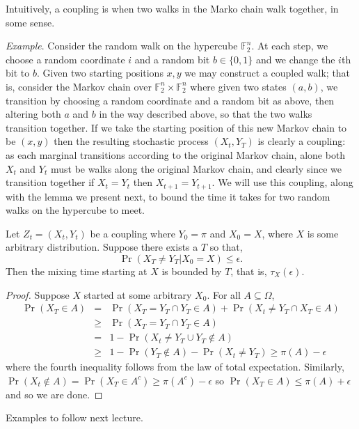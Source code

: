 Intuitively, a coupling is when two walks in the Marko chain walk together, in some sense.

\emph{Example}. Consider the random walk on the hypercube $\mathbb{F}_2^n$. At each step, we choose a random coordinate $i$ and a random bit $b \in \{0, 1\}$ and we change the $i$th bit to $b$. Given two starting positions $x, y$ we may construct a coupled walk; that is, consider the Markov chain over $\mathbb{F}_2^n \times \mathbb{F}_2^n$ where given two states $(a,b)$, we transition by choosing a random coordinate and a random bit as above, then altering both $a$ and $b$ in the way described above, so that the two walks transition together. If we take the starting position of this new Markov chain to be $(x, y)$ then the resulting stochastic process $(X_t, Y_T)$ is clearly a coupling: as each marginal transitions according to the original Markov chain, alone both $X_t$ and $Y_t$ must be walks along the original Markov chain, and clearly since we transition together if $X_t = Y_t$ then $X_{t + 1} = Y_{t + 1}$. We will use this coupling, along with the lemma we present next, to bound the time it takes for two random walks on the hypercube to meet.

\begin{lemma}
Let $Z_t = (X_t, Y_t)$ be a coupling where $Y_0 = \pi$ and $X_0 = X$, where $X$ is some arbitrary distribution. Suppose there exists a $T$ so that,
\[\Pr (X_T \neq Y_T | X_0 = X) \leq \epsilon.\]
Then the mixing time starting at $X$ is bounded by $T$, that is, $\tau_X (\epsilon)$.
\end{lemma}
\begin{proof}
Suppose $X$ started at some arbitrary $X_0$. For all $A \subseteq \Omega$,
\begin{eqnarray*}
\Pr (X_T \in A) &=& \Pr (X_T = Y_T \cap Y_T \in A) + \Pr (X_t \neq Y_T \cap X_T \in A) \\
&\geq& \Pr (X_T = Y_T \cap Y_T \in A) \\
&=& 1 - \Pr (X_t \neq Y_T \cup Y_T \not\in A) \\
&\geq& 1 - \Pr (Y_T \not\in A) - \Pr (X_t \neq Y_T) \geq \pi (A) - \epsilon
\end{eqnarray*}
where the fourth inequality follows from the law of total expectation. Similarly, $\Pr (X_t \not\in A) = \Pr (X_T \in A^c) \geq \pi (A^c) - \epsilon$ so $\Pr (X_T \in A) \leq \pi (A) + \epsilon$
and so we are done.
\end{proof}

Examples to follow next lecture.